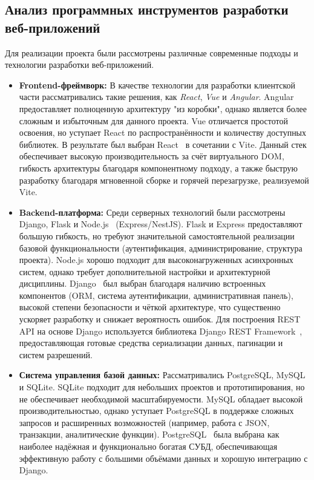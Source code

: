 \subsection{Анализ программных инструментов разработки веб-приложений}

Для реализации проекта были рассмотрены различные современные подходы и технологии разработки веб-приложений.

\begin{itemize}
	\item \textbf{Frontend-фреймворк:} В качестве технологии для разработки клиентской части рассматривались такие решения, как \textit{React}, \textit{Vue} и \textit{Angular}. Angular предоставляет полноценную архитектуру "из коробки", однако является более сложным и избыточным для данного проекта. Vue отличается простотой освоения, но уступает React по распространённости и количеству доступных библиотек. В результате был выбран React~\cite{react_docs} в сочетании с Vite. Данный стек обеспечивает высокую производительность за счёт виртуального DOM, гибкость архитектуры благодаря компонентному подходу, а также быструю разработку благодаря мгновенной сборке и горячей перезагрузке, реализуемой Vite.

	\item \textbf{Backend-платформа:} Среди серверных технологий были рассмотрены Django, Flask и Node.js~\cite{cantelon2017node} (Express/NestJS). Flask и Express предоставляют большую гибкость, но требуют значительной самостоятельной реализации базовой функциональности (аутентификация, администрирование, структура проекта). Node.js хорошо подходит для высоконагруженных асинхронных систем, однако требует дополнительной настройки и архитектурной дисциплины. Django~\cite{django_docs} был выбран благодаря наличию встроенных компонентов (ORM, система аутентификации, административная панель), высокой степени безопасности и чёткой архитектуре, что существенно ускоряет разработку и снижает вероятность ошибок. Для построения REST API на основе Django используется библиотека Django REST Framework~\cite{drf_docs}, предоставляющая готовые средства сериализации данных, пагинации и систем разрешений.

    \item \textbf{Система управления базой данных:} Рассматривались PostgreSQL, MySQL и SQLite. SQLite подходит для небольших проектов и прототипирования, но не обеспечивает необходимой масштабируемости. MySQL обладает высокой производительностью, однако уступает PostgreSQL в поддержке сложных запросов и расширенных возможностей (например, работа с JSON, транзакции, аналитические функции). PostgreSQL~\cite{postgres_docs} была выбрана как наиболее надёжная и функционально богатая СУБД, обеспечивающая эффективную работу с большими объёмами данных и хорошую интеграцию с Django.


\end{itemize}
